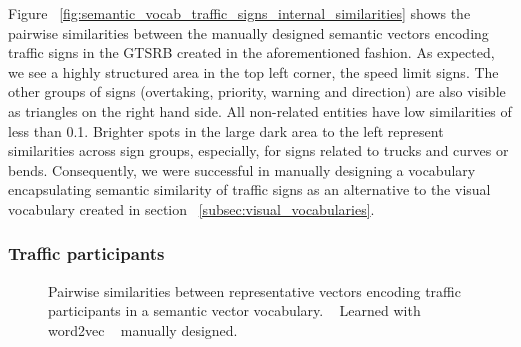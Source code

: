 Figure ~\ref{fig:semantic_vocab_traffic_signs_internal_similarities} shows the pairwise similarities between the manually designed semantic vectors encoding traffic signs in the \ac{GTSRB} created in the aforementioned fashion.
As expected, we see a highly structured area in the top left corner, the speed limit signs.
The other groups of signs (overtaking, priority, warning and direction) are also visible as triangles on the right hand side.
All non-related entities have low similarities of less than \num{0.1}.
Brighter spots in the large dark area to the left represent similarities across sign groups, especially, for signs related to trucks and curves or bends.
Consequently, we were successful in manually designing a vocabulary encapsulating semantic similarity of traffic signs as an alternative to the visual vocabulary created in section ~\ref{subsec:visual_vocabularies}.

\subsubsection{Traffic participants}%
\label{ssubsec:traffic_participants}

\begin{figure}[t]
    \centering
    \caption{Pairwise similarities between representative vectors encoding traffic participants in a semantic vector vocabulary. ~\protect{} Learned with word2vec ~\protect{} manually designed.}
    \label{fig:semantic_vocab_traffic_participants_internal_similarities}
\end{figure}

